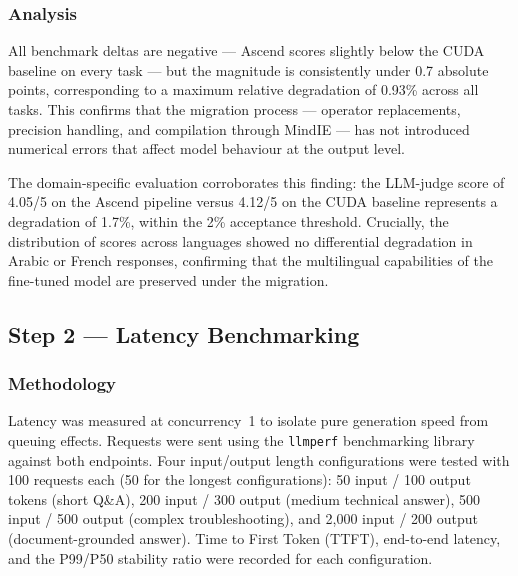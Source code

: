 \subsubsection{Analysis}

All benchmark deltas are negative — Ascend scores slightly
below the CUDA baseline on every task — but the magnitude
is consistently under 0.7 absolute points, corresponding to
a maximum relative degradation of 0.93\% across all tasks.
This confirms that the migration process — operator
replacements, precision handling, and compilation through
MindIE — has not introduced numerical errors that affect
model behaviour at the output level.

The domain-specific evaluation corroborates this finding:
the LLM-judge score of 4.05/5 on the Ascend pipeline versus
4.12/5 on the CUDA baseline represents a degradation of 1.7\%,
within the 2\% acceptance threshold. Crucially, the distribution
of scores across languages showed no differential degradation
in Arabic or French responses, confirming that the multilingual
capabilities of the fine-tuned model are preserved under the
migration.


\subsection{Step 2 — Latency Benchmarking}
\label{subsec:latency-results}

\subsubsection{Methodology}

Latency was measured at concurrency~1 to isolate pure
generation speed from queuing effects. Requests were sent
using the \texttt{llmperf} benchmarking library against both
endpoints. Four input/output length configurations were tested
with 100 requests each (50 for the longest configurations):
50 input / 100 output tokens (short Q\&A), 200 input / 300
output (medium technical answer), 500 input / 500 output
(complex troubleshooting), and 2,000 input / 200 output
(document-grounded answer). Time to First Token (TTFT),
end-to-end latency, and the P99/P50 stability ratio were
recorded for each configuration.

